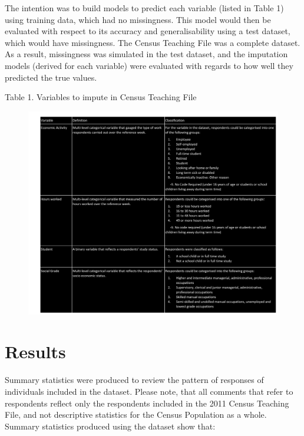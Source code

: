 \documentclass[]{book}
\begin{document}
The intention was to build models to predict each variable (listed in
Table 1) using training data, which had no missingness. This model would
then be evaluated with respect to its accuracy and generalisability
using a test dataset, which would have missingness. The Census Teaching
File was a complete dataset. As a result, missingness was simulated in
the test dataset, and the imputation models (derived for each variable)
were evaluated with regards to how well they predicted the true values.

Table 1. Variables to impute in Census Teaching File

\begin{figure}
\centering
\includegraphics{images/ImputableVariables.svg}
\caption{}
\end{figure}

\chapter{Results}\label{results}

Summary statistics were produced to review the pattern of responses of
individuals included in the dataset. Please note, that all comments that
refer to respondents reflect only the respondents included in the 2011
Census Teaching File, and not descriptive statistics for the Census
Population as a whole. Summary statistics produced using the dataset
show that:
\end{document}
